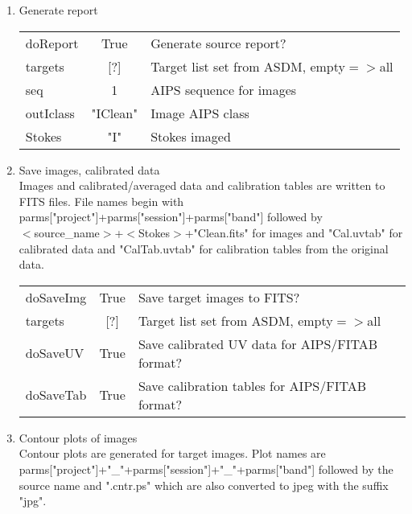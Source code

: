 \documentclass[11pt]{article}
\begin{document}
\begin{enumerate}
\begin{center}
\begin{tabular}{|l|c|l|}
\hline
\end{tabular}
\end{center}
%
\newpage
\item Generate report\\
\begin{center}
\begin{tabular}{|l|c|l|}
\hline
doReport    & True     & Generate source report? \\
targets     & [?]      & Target list set from ASDM, empty$=>$all\\
seq         & 1        & AIPS sequence for images \\
outIclass   & "IClean" & Image AIPS class\\
Stokes      & "I"      & Stokes imaged \\
\hline
\end{tabular}
\end{center}
%
\item Save images, calibrated data\\
Images and calibrated/averaged data and calibration tables are written
to FITS files.
File names begin with \\
parms["project"]+parms["session"]+parms["band"]
followed by \\
$<$source\_name$>$+$<$Stokes$>$+"Clean.fits" for images and
"Cal.uvtab" for calibrated data and "CalTab.uvtab" for calibration
tables from the original data.
\begin{center}
\begin{tabular}{|l|c|l|}
\hline
doSaveImg & True &  Save target images to FITS?\\
targets   & [?]  & Target list set from ASDM, empty$=>$all\\
doSaveUV  & True & Save calibrated UV data for AIPS/FITAB format? \\
doSaveTab & True &  Save calibration tables for AIPS/FITAB format?\\
\hline
\end{tabular}
\end{center}
%
\item Contour plots of images\\
Contour plots are generated for target images.
Plot names are \\
parms["project"]+"\_"+parms["session"]+"\_"+parms["band"]
followed by the source name and ".cntr.ps" which are also converted
to jpeg with the suffix "jpg".
\begin{center}
\begin{tabular}{|l|c|l|}

\end{tabular}
\end{center}
\end{enumerate}
\end{document}
